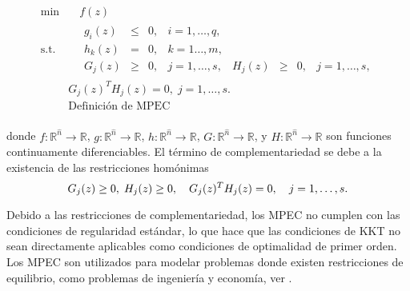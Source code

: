 \begin{equation}
\begin{aligned}
\min  &\quad  f(z)  \\
\text{s.t.} &\quad \begin{matrix} g_i(z)& \leq& 0, &i=1,\ldots,q, \\ h_k(z) &=& 0,&k=1\ldots,m, \\
 G_j(z) &\geq& 0, & j=1,\ldots,s,& H_j(z) &\geq& 0, & j=1,\ldots,s, \end{matrix}
\\&G_j(z)^T H_j(z) = 0,\; j=1,\ldots,s. \\
&\text{Definición de MPEC} \\
\end{aligned}  
\label{eq:DefMpec}
\end{equation}

donde $f: \mathbb{R}^{\hat{n}} \to \mathbb{R}$, $g: \mathbb{R}^{\hat{n}} \to \mathbb{R}$, $h: \mathbb{R}^{\hat{n}} \to \mathbb{R}$, $G: \mathbb{R}^{\hat{n}} \to \mathbb{R}$, y $H: \mathbb{R}^{\hat{n}} \to \mathbb{R}$ son funciones continuamente diferenciables. 
El término de complementariedad se debe a la existencia de las restricciones homónimas 
\begin{equation}
    G_j(z) \geq 0, \; H_j(z) \geq 0, \quad G_j(z)^T H_j(z) = 0,\quad  j=1,\ldots,s. \\ \label{eq:RestriccionesComplementariedadAbstracto}
\end{equation}

Debido a las restricciones de complementariedad, los MPEC no cumplen con las condiciones de regularidad estándar, lo que hace que las condiciones de KKT no sean directamente aplicables como condiciones de optimalidad de primer orden. Los MPEC son utilizados para modelar problemas donde existen restricciones de equilibrio, como problemas de ingeniería y economía, ver \cite{Flegel2003AFJ,DempeyZemkoho2020}.




